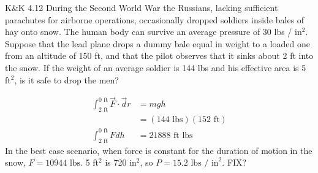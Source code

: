 \documentclass{esg8012pset}
\begin{document}
\begin{problem}{K\&K 4.12}
  During the Second World War the Russians, lacking sufficient parachutes for airborne operations, occasionally dropped soldiers inside bales of hay onto snow. The human body can survive an average pressure of 30 lbs / in$^2$. Suppose that the lead plane drops a dummy bale equal in weight to a loaded one from an altitude of 150 ft, and that the pilot observes that it sinks about 2 ft into the snow. If the weight of an average soldier is 144 lbs and his effective area is 5 ft$^2$, is it safe to drop the men?
\end{problem}
\begin{solution}
  \begin{align*}
    \int_{2\text{ ft}}^{0\text{ ft}} \vec F \cdot \vec d r & = m g h \\
    & = (144\text{ lbs})(152\text{ ft}) \\
    \int_{2\text{ ft}}^{0\text{ ft}} F d h & = 21888\text{ ft lbs}
  \end{align*}
  In the best case scenario, when force is constant for the duration of motion in the snow, $F = 10944\text{ lbs}$.  5 ft$^2$ is 720 in$^2$, so $P = 15.2\text{ lbs / in}^2$.  FIX?
\end{solution}
\end{document}
